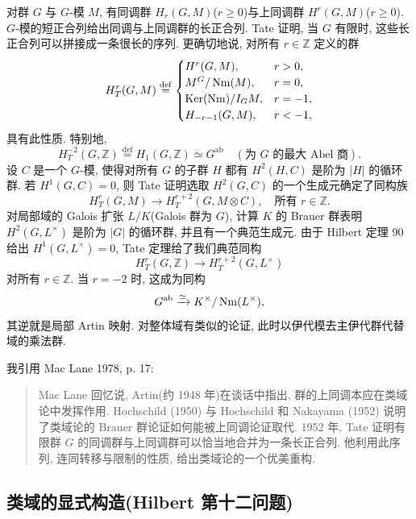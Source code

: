 对群 $G$ 与 $G$-模 $M$, 有同调群 $H_{r}(G, M)$($r \geq 0$)与上同调群 $H^{r}(G, M)$($r \geq 0$). $G$-模的短正合列给出同调与上同调群的长正合列. Tate 证明, 当 $G$ 有限时, 这些长正合列可以拼接成一条很长的序列. 更确切地说, 对所有 $r \in \mathbb{Z}$ 定义的群
\[
H_{T}^{r}(G, M) \overset{\mathrm{def}}{=}
\begin{cases}
H^{r}(G, M), & r > 0, \\
M^{G}/\operatorname{Nm}(M), & r = 0, \\
\operatorname{Ker}(\operatorname{Nm})/I_{G}M, & r = -1, \\
H_{-r-1}(G, M), & r < -1,
\end{cases}
\]
具有此性质. 特别地,
\[
H_{T}^{-2}(G, \mathbb{Z}) \overset{\mathrm{def}}{=} H_{1}(G, \mathbb{Z}) \simeq G^{\mathrm{ab}} \quad (\text{为 } G \text{ 的最大 Abel 商}).
\]
设 $C$ 是一个 $G$-模, 使得对所有 $G$ 的子群 $H$ 都有 $H^{2}(H, C)$ 是阶为 $|H|$ 的循环群. 若 $H^{1}(G, C) = 0$, 则 Tate 证明选取 $H^{2}(G, C)$ 的一个生成元确定了同构族
\[
H_{T}^{r}(G, M) \to H_{T}^{r+2}(G, M \otimes C), \quad \text{所有 } r \in \mathbb{Z}.
\]
对局部域的 Galois 扩张 $L/K$(Galois 群为 $G$), 计算 $K$ 的 Brauer 群表明 $H^{2}(G, L^{\times})$ 是阶为 $|G|$ 的循环群, 并且有一个典范生成元. 由于 Hilbert 定理 90 给出 $H^{1}(G, L^{\times}) = 0$, Tate 定理给了我们典范同构
\[
H_{T}^{r}(G, \mathbb{Z}) \to H_{T}^{r+2}(G, L^{\times})
\]
对所有 $r \in \mathbb{Z}$. 当 $r = -2$ 时, 这成为同构
\[
G^{\mathrm{ab}} \xrightarrow{\simeq} K^{\times}/\operatorname{Nm}(L^{\times}),
\]
其逆就是局部 Artin 映射. 对整体域有类似的论证, 此时以伊代模去主伊代群代替域的乘法群.

\begin{NOTES}
我引用 Mac Lane 1978\cite{MacLane1978}, p. 17:

\begin{quote}
Mac Lane 回忆说, Artin(约 1948 年)在谈话中指出, 群的上同调本应在类域论中发挥作用. Hochschild (1950) 与 Hochschild 和 Nakayama (1952) 说明了类域论的 Brauer 群论证如何能被上同调论证取代. 1952 年, Tate 证明有限群 $G$ 的同调群与上同调群可以恰当地合并为一条长正合列. 他利用此序列, 连同转移与限制的性质, 给出类域论的一个优美重构.
\end{quote}
\end{NOTES}

\subsection*{类域的显式构造(Hilbert 第十二问题)}

